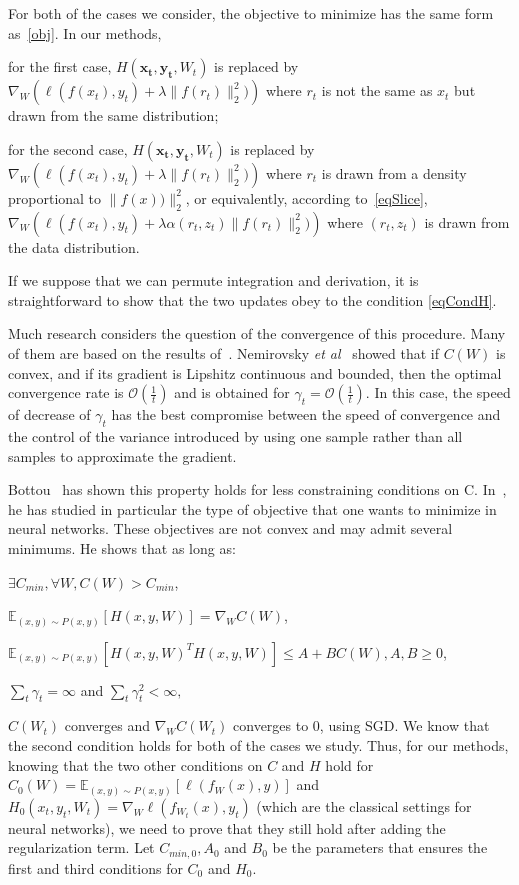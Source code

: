 \documentclass{article}
\begin{document}
For both of the cases we consider, the objective to minimize has the same form as~\eqref{obj}. In our methods,
\begin{inparaenum}[(i)]
\item for the first case, $H(\mathbf{x_t,y_t},W_t)$ is replaced by $\nabla_W \left(\ell(f(x_{t}),y_{t}) + \lambda \| f(r_{t})\|_2^2)\right)$ where $r_t$ is not the same as $x_t$ but drawn from the same distribution; 
\item for the second case, $H(\mathbf{x_t,y_t},W_t)$ is replaced by $\nabla_W \left(\ell(f(x_{t}),y_{t}) + \lambda \| f(r_{t})\|_2^2)\right)$ where $r_t$ is drawn from a density proportional to $\| f(x))\|_2^2$, or equivalently, according to~\eqref{eqSlice}, $\nabla_W \left(\ell(f(x_{t}),y_{t}) + \lambda \alpha(r_t,z_t)\|f(r_{t})\|_2^2)\right)$ where $(r_t,z_t)$ is drawn from the data distribution.
\end{inparaenum}
If we suppose that we can permute integration and derivation, it is straightforward to show that the two updates obey to the condition \eqref{eqCondH}.

Much research considers the question of the convergence of this procedure. Many of them are based on the results of~\cite{robbins1985convergence}. Nemirovsky \textit{et al}~\cite{nemirovski2009robust} showed that if $C(W)$ is convex, and if its gradient is Lipshitz continuous and bounded, then the optimal convergence rate is $\mathcal{O}(\frac{1}{t})$ and is obtained for $\gamma_t = \mathcal{O}(\frac{1}{t})$. In this case, the speed of decrease of $\gamma_t$ has the best compromise between the speed of convergence and the control of the variance introduced by using one sample rather than all samples to approximate the gradient.

Bottou~\cite{bottou1998online, bottou2010large, bottou2012stochastic} has shown this property holds for less constraining conditions on C. In~\cite{bottou1991stochastic}, he has studied in particular the type of objective that one wants to minimize in neural networks. These objectives are not convex and may admit several minimums. He shows that as long as: 
\begin{inparaenum}[(i)]
\item $\exists C_{min}, \forall W, C(W)>C_{min}$,
\item $\mathbb{E}_{(x,y)\sim P(x,y)}[H(x,y,W)] = \nabla_WC(W)$,
\item $\mathbb{E}_{(x,y)\sim P(x,y)}[H(x,y,W)^TH(x,y,W)] \le A + BC(W), A,B \geq 0$,
\item $\sum_t \gamma_t = \infty$ and $\sum_t \gamma_t^2 < \infty,$
\end{inparaenum}
$C(W_t)$ converges and $\nabla_WC(W_t)$ converges to 0, using SGD.  We know that the second condition holds for both of the cases we study. Thus, for our methods, knowing that the two other conditions on $C$ and $H$ hold for $C_0(W) = \mathbb{E}_{(x,y) \sim P(x,y)}[\ell(f_W(x),y)]$ and $H_0(x_t,y_t,W_t) = \nabla_W\ell(f_{W_t}(x),y_t)$ (which are the classical settings for neural networks), we need to prove that they still hold after adding the regularization term. Let $C_{min,0}, A_0$ and $B_0$ be the parameters that ensures the first and third conditions for $C_0$ and $H_0$.
\end{document}
